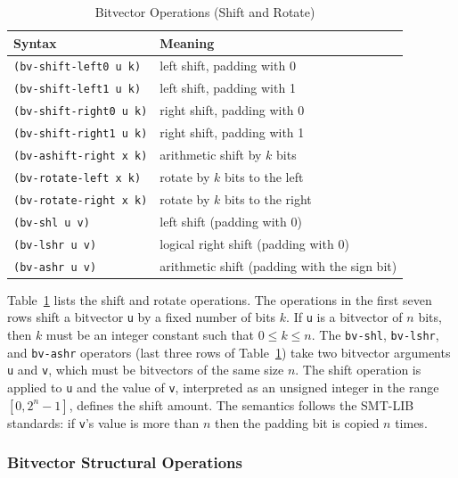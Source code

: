 \documentclass[11pt,twoside,fleqn,openright,titlepage]{cslreport}
\begin{document}
\begin{table}
\begin{small}
\begin{center}
\begin{tabular}{|p{5cm}|l|}
\hline
Syntax & Meaning \\
\hline
\texttt{(bv-shift-left0 u k)} & left shift, padding with 0\\
\texttt{(bv-shift-left1 u k)} & left shift, padding with 1\\
\texttt{(bv-shift-right0 u k)} & right shift, padding with 0\\
\texttt{(bv-shift-right1 u k)} & right shift, padding with 1\\
\texttt{(bv-ashift-right x k)} &  arithmetic shift by $k$ bits\\
\texttt{(bv-rotate-left x k)} & rotate by $k$ bits to the left\\
\texttt{(bv-rotate-right x k)} & rotate by $k$ bits to the right\\
\hline
\texttt{(bv-shl u v)} & left shift (padding with 0)\\
\texttt{(bv-lshr u v)} & logical right shift (padding with 0) \\
\texttt{(bv-ashr u v)} & arithmetic shift (padding with the sign bit)\\
\hline
\end{tabular}
\end{center}
\end{small}
\caption{Bitvector Operations (Shift and Rotate)}
\label{bitvectors2}
\end{table}

Table~\ref{bitvectors2} lists the shift and rotate operations. The
operations in the first seven rows shift a bitvector \texttt{u} by a
fixed number of bits $k$. If \texttt{u} is a bitvector of $n$ bits,
then $k$ must be an integer constant such that $0 \leq k \leq n$. The
\texttt{bv-shl}, \texttt{bv-lshr}, and \texttt{bv-ashr} operators
(last three rows of Table~\ref{bitvectors2}) take two bitvector
arguments \texttt{u} and \texttt{v}, which must be bitvectors of the
same size $n$. The shift operation is applied to \texttt{u} and the
value of \texttt{v}, interpreted as an unsigned integer in the range
$[0, 2^n-1]$, defines the shift amount. The semantics follows the
SMT-LIB standards: if \texttt{v}'s value is more than $n$ then the
padding bit is copied $n$ times.

\subsubsection*{Bitvector Structural Operations}
\end{document}
